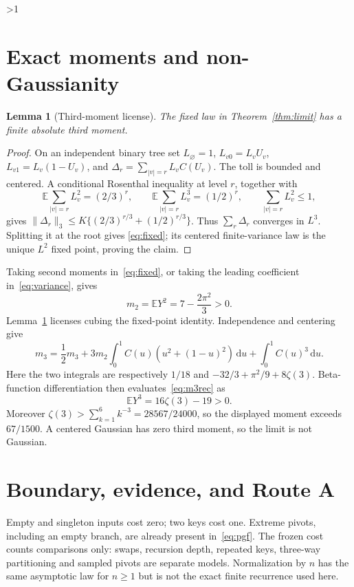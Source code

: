 \documentclass[10pt]{article}
\providecommand{\CRevisionRound}{2}
\newtheorem{lemma}{Lemma}
\newcommand{\E}{\mathbb E}
\newcommand{\dd}{\mathrm d}
\begin{document}
\ifnum\CRevisionRound>1
\section{Exact moments and non-Gaussianity}
\begin{lemma}[Third-moment license]\label{lem:l3}
The fixed law in Theorem~\ref{thm:limit} has a finite absolute third moment.
\end{lemma}
\begin{proof}
On an independent binary tree set $L_\varnothing=1$,
$L_{v0}=L_vU_v$, $L_{v1}=L_v(1-U_v)$, and
$\Delta_r=\sum_{|v|=r}L_vC(U_v)$.  The toll is bounded and centered.  A
conditional Rosenthal inequality at level $r$, together with
\[
 \E\sum_{|v|=r}L_v^2=(2/3)^r,\qquad
 \E\sum_{|v|=r}L_v^3=(1/2)^r,\qquad \sum_{|v|=r}L_v^2\le1,
\]
gives $\|\Delta_r\|_3\le K\{(2/3)^{r/3}+(1/2)^{r/3}\}$.
Thus $\sum_r\Delta_r$ converges in $L^3$.  Splitting it at the root gives
\eqref{eq:fixed}; its centered finite-variance law is the unique $L^2$ fixed
point, proving the claim.
\end{proof}

Taking second moments in~\eqref{eq:fixed}, or taking the leading coefficient
in~\eqref{eq:variance}, gives
\begin{equation}\label{eq:m2}
 m_2=\E Y^2=7-\frac{2\pi^2}{3}>0.
\end{equation}
Lemma~\ref{lem:l3} licenses cubing the fixed-point identity.  Independence and
centering give
\begin{equation}\label{eq:m3rec}
 m_3=\frac12m_3+3m_2\int_0^1C(u)(u^2+(1-u)^2)\,\dd u
                  +\int_0^1C(u)^3\,\dd u.
\end{equation}
Here the two integrals are respectively
$1/18$ and $-32/3+\pi^2/9+8\zeta(3)$.  Beta-function differentiation then
evaluates~\eqref{eq:m3rec} as
\begin{equation}\label{eq:m3}
 \E Y^3=16\zeta(3)-19>0.
\end{equation}
Moreover $\zeta(3)>\sum_{k=1}^{6}k^{-3}=28567/24000$, so the displayed
moment exceeds $67/1500$.  A centered Gaussian has zero third moment, so the
limit is not Gaussian.

\section{Boundary, evidence, and Route A}
Empty and singleton inputs cost zero; two keys cost one.  Extreme pivots,
including an empty branch, are already present in~\eqref{eq:pgf}.  The frozen
cost counts comparisons only: swaps, recursion depth, repeated keys,
three-way partitioning and sampled pivots are separate models.  Normalization
by $n$ has the same asymptotic law for $n\ge1$ but is not the exact finite
recurrence used here.
\end{document}
